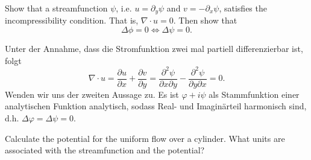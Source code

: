 \documentclass[12pt]{exam}
\newcommand{\del}{\partial}
\begin{document}
\begin{questions}
    
    \question Show that a streamfunction $\psi$, i.e. $u = \del_y \psi$ and $v = -\del_x \psi$, satisfies the incompressibility condition. That is, $\nabla \cdot u = 0$. Then show that
    \begin{equation*}
        \Delta \phi = 0 \iff \Delta \psi = 0.
    \end{equation*}
    
    \begin{solution}
        Unter der Annahme, dass die Stromfunktion zwei mal partiell differenzierbar ist, folgt
        \begin{equation*}
            \nabla \cdot u = \frac{\del u}{\del x} + \frac{\del v}{\del y} = \frac{\del^2 \psi}{\del x \del y} - \frac{\del^2 \psi}{\del y \del x} = 0.
        \end{equation*}
        Wenden wir uns der zweiten Aussage zu. Es ist $\varphi + i \psi$ als Stammfunktion einer analytischen Funktion analytisch, sodass Real- und Imaginärteil harmonisch sind, d.h. $\Delta \varphi = \Delta \psi = 0$.
    \end{solution}
    
    
    \question Calculate the potential for the uniform flow over a cylinder. What units are associated with the streamfunction and the potential?
    

\end{questions}
\end{document}
